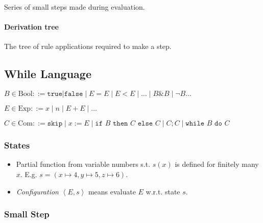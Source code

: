 \documentclass[twocolumn,english]{article}
\begin{document}
Series of small steps made during evaluation.

\paragraph{Derivation tree}

The tree of rule applications required to make a step.

\subsection{While Language}

$B\in\text{Bool}::=\texttt{true}\lvert\texttt{false}\mid E=E\mid E<E\mid\dots\mid B\&B\mid\neg B\dots$

$E\in\text{Exp}::=x\mid n\mid E+E\mid\dots$

$C\in\text{Com}::=\texttt{skip}\mid x:=E\mid\texttt{if }B\texttt{ then }C\texttt{ else }C\mid C;C\mid\texttt{while }B\texttt{ do }C$

\subsubsection{States}
\begin{itemize}
\item Partial function from variable numbers s.t. $s(x)$ is defined for
finitely many $x$. E.g. $s=\left(x\mapsto4,y\mapsto5,z\mapsto6\right)$.
\item \emph{Configuration} $\left\langle E,s\right\rangle $ means evaluate
$E$ w.r.t. state $s$.
\end{itemize}

\subsubsection{Small Step}
\end{document}
